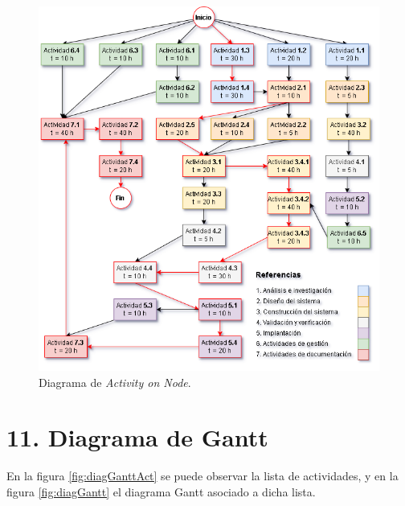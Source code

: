 \documentclass[
11pt, %
]{charter}
\begin{document}
\begin{figure}[htpb]
  \centering
  \includegraphics[width=.95\textwidth]{./Figuras/AoN.png}
  \caption{Diagrama de \textit{Activity on Node}.}
  \label{fig:AoN}
\end{figure}

\section{11. Diagrama de Gantt}
\label{sec:gantt}

En la figura \ref{fig:diagGanttAct} se puede observar la lista de actividades, y en la figura \ref{fig:diagGantt} el diagrama Gantt asociado a dicha lista.
\end{document}
